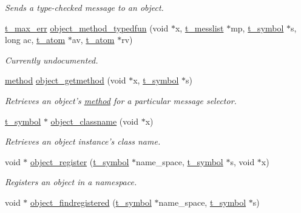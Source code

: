 \begin{DoxyCompactItemize}
\begin{DoxyCompactList}\small\item\em Sends a type-\/checked message to an object. \item\end{DoxyCompactList}\item 
\hyperlink{group__datatypes_ga73edaae82b318855cc09fac994918165}{t\_\-max\_\-err} \hyperlink{group__obj_gaa5ff59d2297a2dde60e3f2fe3e02eceb}{object\_\-method\_\-typedfun} (void $\ast$x, \hyperlink{structt__messlist}{t\_\-messlist} $\ast$mp, \hyperlink{structt__symbol}{t\_\-symbol} $\ast$s, long ac, \hyperlink{structt__atom}{t\_\-atom} $\ast$av, \hyperlink{structt__atom}{t\_\-atom} $\ast$rv)
\begin{DoxyCompactList}\small\item\em Currently undocumented. \item\end{DoxyCompactList}\item 
\hyperlink{group__datatypes_gac26ba0a173b50597f5738132e059b42d}{method} \hyperlink{group__obj_gaaa202dcda859bb5dcd1f186f88a43796}{object\_\-getmethod} (void $\ast$x, \hyperlink{structt__symbol}{t\_\-symbol} $\ast$s)
\begin{DoxyCompactList}\small\item\em Retrieves an object's \hyperlink{group__datatypes_gac26ba0a173b50597f5738132e059b42d}{method} for a particular message selector. \item\end{DoxyCompactList}\item 
\hyperlink{structt__symbol}{t\_\-symbol} $\ast$ \hyperlink{group__obj_gac4523e68b4be4deb6db0ea91948d3553}{object\_\-classname} (void $\ast$x)
\begin{DoxyCompactList}\small\item\em Retrieves an object instance's class name. \item\end{DoxyCompactList}\item 
void $\ast$ \hyperlink{group__obj_gaaa97beba179d6aebd3f3ede1b5c781fa}{object\_\-register} (\hyperlink{structt__symbol}{t\_\-symbol} $\ast$name\_\-space, \hyperlink{structt__symbol}{t\_\-symbol} $\ast$s, void $\ast$x)
\begin{DoxyCompactList}\small\item\em Registers an object in a namespace. \item\end{DoxyCompactList}\item 
void $\ast$ \hyperlink{group__obj_ga3854b233b015cf2e157b03819ce9b65e}{object\_\-findregistered} (\hyperlink{structt__symbol}{t\_\-symbol} $\ast$name\_\-space, \hyperlink{structt__symbol}{t\_\-symbol} $\ast$s)

\end{DoxyCompactItemize}
